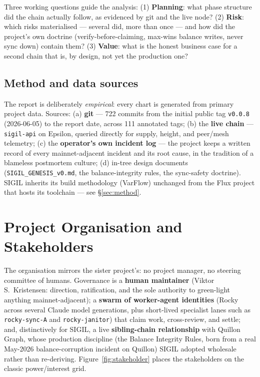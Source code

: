 Three working questions guide the analysis: (1) \textbf{Planning}: what phase structure did the chain actually follow, as evidenced by git and the live node? (2) \textbf{Risk}: which risks materialised --- several did, more than once --- and how did the project's own doctrine (verify-before-claiming, max-wins balance writes, never sync down) contain them? (3) \textbf{Value}: what is the honest business case for a second chain that is, by design, not yet the production one?

\subsection{Method and data sources}

The report is deliberately \emph{empirical}: every chart is generated from primary project data. Sources: (a) \textbf{git} --- 722 commits from the initial public tag \texttt{v0.0.8} (2026-06-05) to the report date, across 111 annotated tags; (b) the \textbf{live chain} --- \texttt{sigil-api} on Epsilon, queried directly for supply, height, and peer/mesh telemetry; (c) the \textbf{operator's own incident log} --- the project keeps a written record of every mainnet-adjacent incident and its root cause, in the tradition of a blameless postmortem culture; (d) in-tree design documents (\texttt{SIGIL\_GENESIS\_v0.md}, the balance-integrity rules, the sync-safety doctrine). SIGIL inherits its build methodology (VarFlow) unchanged from the Flux project that hosts its toolchain --- see \S\ref{sec:method}.

\section{Project Organisation and Stakeholders}

The organisation mirrors the sister project's: no project manager, no steering committee of humans. Governance is a \textbf{human maintainer} (Viktor S.\ Kristensen: direction, ratification, and the sole authority to green-light anything mainnet-adjacent); a \textbf{swarm of worker-agent identities} (Rocky across several Claude model generations, plus short-lived specialist lanes such as \texttt{rocky-sync-A} and \texttt{rocky-janitor}) that claim work, cross-review, and settle; and, distinctively for SIGIL, a live \textbf{sibling-chain relationship} with Quillon Graph, whose production discipline (the Balance Integrity Rules, born from a real May-2026 balance-corruption incident on Quillon) SIGIL adopted wholesale rather than re-deriving. Figure~\ref{fig:stakeholder} places the stakeholders on the classic power/interest grid.

